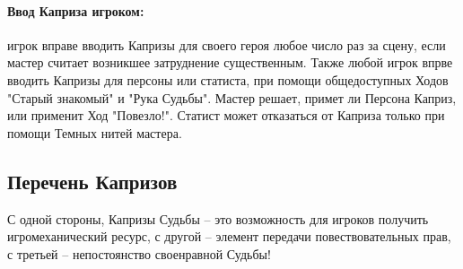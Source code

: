\paragraph{Ввод Каприза игроком:} игрок вправе вводить Капризы для своего героя любое число раз за сцену, если мастер считает возникшее затруднение существенным.
\newline Также любой игрок впрве вводить Капризы для персоны или статиста, при помощи общедоступных Ходов "Старый знакомый" и "Рука Судьбы". Мастер решает, примет ли Персона Каприз, или применит Ход "Повезло!". Статист может отказаться от Каприза только при помощи Темных нитей мастера.

\subsection{Перечень Капризов}
С одной стороны, Капризы Судьбы – это возможность для игроков получить игромеханический ресурс, с другой – элемент передачи повествовательных прав, с третьей – непостоянство своенравной Судьбы!

